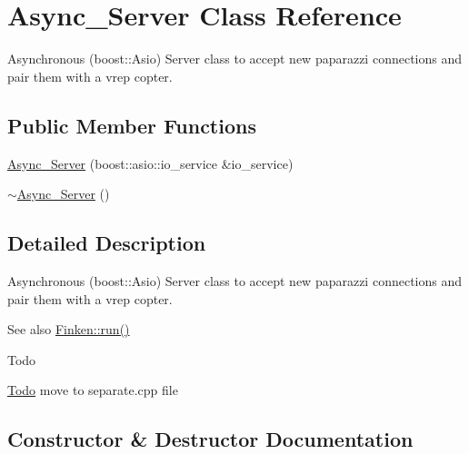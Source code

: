 \hypertarget{classAsync__Server}{}\section{Async\+\_\+\+Server Class Reference}
\label{classAsync__Server}


Asynchronous (boost\+::\+Asio) Server class to accept new paparazzi connections and pair them with a vrep copter.  


\subsection*{Public Member Functions}
\begin{DoxyCompactItemize}
\item 
\hyperlink{classAsync__Server_a33e192d098956111828840a354da0891}{Async\+\_\+\+Server} (boost\+::asio\+::io\+\_\+service \&io\+\_\+service)
\item 
\hyperlink{classAsync__Server_a7863baf6ecf5a684b61a2bd54ea250b0}{$\sim$\+Async\+\_\+\+Server} ()
\end{DoxyCompactItemize}


\subsection{Detailed Description}
Asynchronous (boost\+::\+Asio) Server class to accept new paparazzi connections and pair them with a vrep copter. 

\begin{DoxySeeAlso}{See also}
\hyperlink{classFinken_ae3c3abbf571407e210f4b03b68cada9d}{Finken\+::run()} 
\end{DoxySeeAlso}
\begin{DoxyRefDesc}{Todo}
\item[\hyperlink{todo__todo000005}{Todo}]move to separate.\+cpp file \end{DoxyRefDesc}


\subsection{Constructor \& Destructor Documentation}
